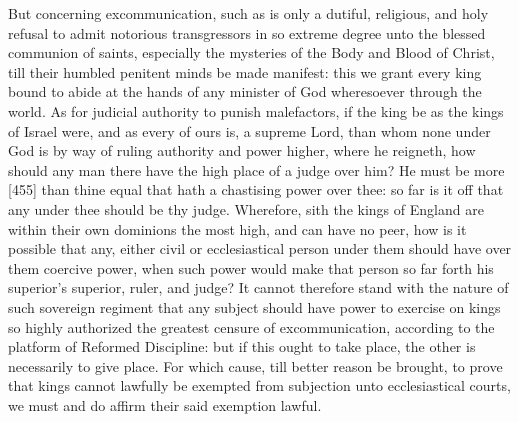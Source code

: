 But concerning excommunication, such as is only a dutiful, religious, and holy refusal to admit notorious transgressors in so extreme degree unto the blessed communion of saints, especially the mysteries of the Body and Blood of Christ, till their humbled penitent minds be made manifest: this we grant every king bound to abide at the hands of any minister of God wheresoever through the world. As for judicial authority to punish malefactors, if the king be as the kings of Israel were, and as every of ours is, a supreme Lord, than whom none under God is by way of ruling authority and power higher, where he reigneth, how should any man there have the high place of a judge over him? He must be more [455] than thine equal that hath a chastising power over thee: so far is it off that any under thee should be thy judge. Wherefore, sith the kings of England are within their own dominions the most high, and can have no peer, how is it possible that any, either civil or ecclesiastical person under them should have over them coercive power, when such power would make that person so far forth his superior’s superior, ruler, and judge? It cannot therefore stand with the nature of such sovereign regiment that any subject should have power to exercise on kings so highly authorized the greatest censure of excommunication, according to the platform of Reformed Discipline: but if this ought to take place, the other is necessarily to give place. For which cause, till better reason be brought, to prove that kings cannot lawfully be exempted from subjection unto ecclesiastical courts, we must and do affirm their said exemption lawful.


